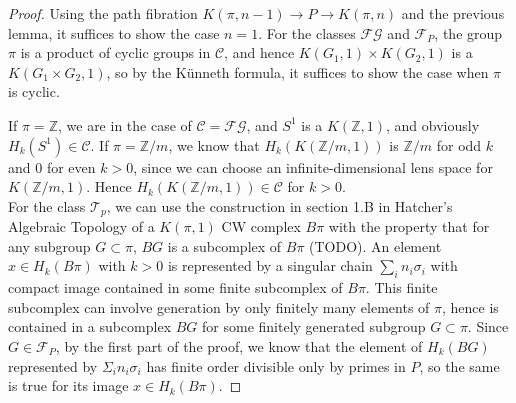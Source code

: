 \documentclass[reqno]{amsart}
\theoremstyle{definition}
\theoremstyle{remark}
\begin{document}
\begin{proof}
    Using the path fibration
    $K\left( \pi,n-1 \right) \to P\to 
    K\left( \pi, n \right) $ and the previous lemma, it
    suffices to show the case $n=1$. 
    For the classes $\mathcal{F} \mathcal{G}$ and
    $\mathcal{F}_P$, the group $\pi$ is a product
    of cyclic groups in $\mathcal{C}$, and hence
    $K\left( G_1, 1 \right) \times 
    K\left( G_2,1 \right) $ is
     a $K\left( G_1 \times G_2,1 \right) $, so by the
     Künneth formula, it suffices to show the case
     when $\pi$ is cyclic.

     If $\pi = \mathbb{Z}$, we are in the case
     of $\mathcal{C} = \mathcal{F} \mathcal{G}$, and
     $S^{1}$ is a $K(\mathbb{Z},1)$, and
     obviously $H_k\left( S^{1}  \right) \in \mathcal{C}$.
     If $\pi = \mathbb{Z} / m$, we know that
     $H_k \left( K\left( \mathbb{Z}/m,1 \right)  \right) $ 
     is $\mathbb{Z} / m$ for odd $k$ and $0$ for even
     $k>0$, since we can choose an infinite-dimensional
     lens space for $K\left( \mathbb{Z}/m,1 \right) $.
     Hence $H_k \left( K\left( \mathbb{Z}/m,1 \right)  \right) 
     \in \mathcal{C}$ for $k>0$.\\
     \linebreak
     For the class
     $\mathcal{T}_p$, we can use the construction
     in section 1.B in Hatcher's Algebraic Topology of
     a $K\left( \pi,1 \right) $ CW complex 
     $B \pi$ with the property that for any
     subgroup $G \subset \pi$, $BG$ is a subcomplex
     of $B \pi$ (TODO).
     An element $x \in H_k \left( B \pi \right) $ with
     $k > 0$ is represented by a singular
     chain $\sum_i n_i \sigma_i$ with compact
     image contained in some finite subcomplex
     of  $B \pi$. This finite subcomplex
     can involve generation by only finitely many elements
     of $\pi$, hence is contained in a subcomplex $BG$ 
     for some finitely generated subgroup $G \subset \pi$.
     Since $G \in \mathcal{F}_P$, by the first part
     of the proof, we know that the element
     of $H_k(BG)$ represented by $\Sigma_i n_i \sigma_i$ has
     finite order divisible only by primes in $P$, so
     the same is true for its image $x \in H_k\left( B \pi \right) $.
\end{proof}
\end{document}
